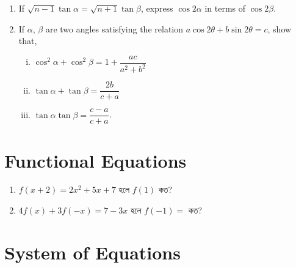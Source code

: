 \documentclass[11pt, a4paper]{article}
\begin{document}
\begin{enumerate}
	\item If $\sqrt{n-1} \tan \alpha = \sqrt{n+1} \tan \beta$, express $\cos 2\alpha$ in terms of $\cos 2\beta$.
	
	\item If $\alpha$, $\beta$ are two angles satisfying the relation $a\cos 2\theta + b \sin 2\theta = c$, show that, 
	\begin{enumerate}[(i)]
		\item $\cos^2  \alpha + \cos^2 \beta = 1 + \dfrac{ac}{a^2 + b^2}$
		\item $\tan \alpha + \tan \beta = \dfrac{2b}{c+a}$
		\item $\tan \alpha \tan \beta = \dfrac{c-a}{c+a}$.
	
	\end{enumerate}
	
	
\end{enumerate}

\section{Functional Equations}

\begin{enumerate}

	\item $ f(x+2) = 2x^2 +5x+7 $ \textbengali{হলে} $ f(1) $ \textbengali{কত}?
	

	\item $ 4f(x) + 3f(-x) = 7 - 3x $ \textbengali{হলে} $ f(-1) = $  \textbengali{কত?}

\end{enumerate}

\section{System of Equations}
\end{document}

